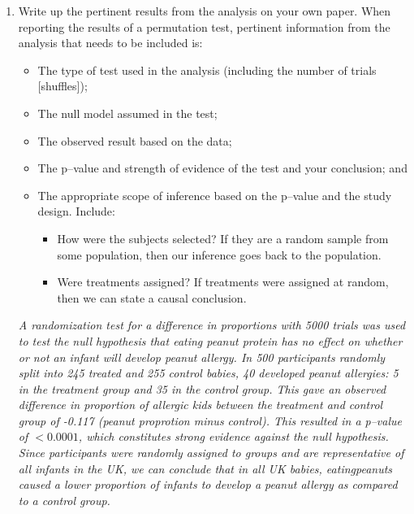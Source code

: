 \begin{enumerate}
    \item \label{reportBullets} Write up  the pertinent
      results from the analysis on your own paper. When reporting the
      results of a permutation test, pertinent information from the
      analysis that  needs to be included is: 
      \begin{itemize}
      \item The type of test used in the analysis (including the
        number of trials [shuffles]);
      \item The null model assumed in the test;
      \item The observed result based on the data;
      \item The p--value and strength of evidence of the test and your
        conclusion; and
      \item The appropriate scope of inference based on the p--value
        and the study design.  Include:
        \begin{itemize}
        \item How were the subjects selected?  If they are a random
          sample from some population, then our inference goes back to
          the population.
        \item Were treatments assigned?  If treatments were assigned
          at random, then we can state a causal conclusion.
        \end{itemize}
      \end{itemize}
\begin{key}
 {\it      A randomization test for a difference in proportions with
      5000 trials was used to test the null hypothesis that eating
      peanut protein has no effect on whether or not an infant will
      develop peanut allergy.  In 500 participants randomly split 
      into 245 treated and 255 control babies, 40 developed peanut
      allergies: 5 in the treatment group and 35  in the control
      group.  This gave an observed difference in
      proportion of allergic kids between the treatment and
      control group of -0.117 (peanut proprotion minus control).  This
      resulted in a p--value of $< 0.0001$, which constitutes  strong
      evidence against the null hypothesis.  Since participants
      were randomly assigned to groups and are representative 
      of all infants in the UK, we can
      conclude that in all UK babies, eatingpeanuts caused a lower
      proportion of infants to develop a peanut allergy as compared to a
      control group.   
     }  
\end{key}

\end{enumerate}

